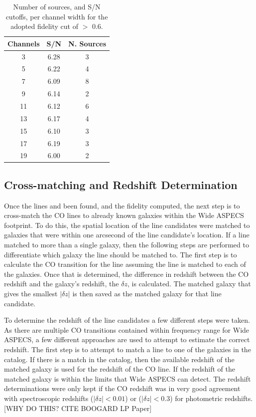 \begin{table}
\centering
\caption{Number of sources, and S/N cutoffs, per channel width for the adopted fidelity cut of $>$ 0.6.}
\begin{tabular}{ccc}
Channels & S/N & N. Sources \\
\hline
3 & 6.28 & 3 \\
5 & 6.22 & 4 \\
7 & 6.09 & 8 \\
9 & 6.14 & 2 \\
11 & 6.12 & 6 \\
13 & 6.17 & 4 \\
15 & 6.10 & 3 \\
17 & 6.19 & 3 \\
19 & 6.00 & 2 \\
\end{tabular}
\end{table}\label{table:Fid_NumTable}

\subsection{Cross-matching and Redshift Determination}

Once the lines and been found, and the fidelity computed, the next step is to cross-match the CO lines to already known galaxies within the Wide ASPECS footprint. To do this, the spatial location of the line candidates were matched to galaxies that were within one arcsecond of the line candidate's location. If a line matched to more than a single galaxy, then the following steps are performed to differentiate which galaxy the line should be matched to. The first step is to calculate the CO transition for the line assuming the line is matched to each of the galaxies. Once that is determined, the difference in redshift between the CO redshift and the galaxy's redshift, the $\delta z$, is calculated. The matched galaxy that gives the smallest $|\delta z|$ is then saved as the matched galaxy for that line candidate. 

To determine the redshift of the line candidates a few different steps were taken. As there are multiple CO transitions contained within frequency range for Wide ASPECS, a few different approaches are used to attempt to estimate the correct redshift. The first step is to attempt to match a line to one of the galaxies in the catalog. If there is a match in the catalog, then the available redshift of the matched galaxy is used for the redshift of the CO line. If the redshift of the matched galaxy is within the limits that Wide ASPECS can detect. The redshift determinations were only kept if the CO redshift was in very good agreement with spectroscopic redshifts ($|\delta z| < 0.01$) or ($|\delta z| < 0.3$) for photometric redshifts. [WHY DO THIS? CITE BOOGARD LP Paper]

